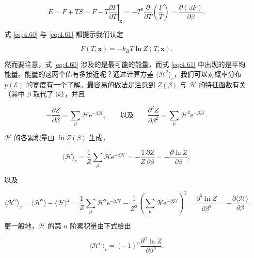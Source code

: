 \begin{equation}\label{eq:4.62}
  E=F+TS=F-T\left.\frac{\partial F}{\partial T}\right|_{\mathbf x}=-T^2\frac{\partial}{\partial T}\left(\frac{F}{T}\right)=\frac{\partial(\beta F)}{\partial\beta}.
\end{equation}

式 \eqref{eq:4.60} 与 \eqref{eq:4.61} 都提示我们认定

\begin{equation}\label{eq:4.63}
  F(T,\mathbf x)=-k_BT\ln Z(T,\mathbf x).
\end{equation}

然而要注意，式 \eqref{eq:4.60} 涉及的是最可能的能量，而式 \eqref{eq:4.61} 中出现的是平均能量。能量的这两个值有多接近呢？通过计算方差 $\langle\mathscr H^2\rangle_c$，我们可以对概率分布 $p(\mathcal{E})$ 的宽度有一个了解。最容易的做法是注意到 $Z(\beta)$ 与 $\mathscr H$ 的特征函数有关（其中 $\beta$ 取代了 $\mathrm{i}k$），并且

\begin{equation}\label{eq:4.64}
  -\frac{\partial Z}{\partial\beta}=\sum_\mu\mathscr H\mathrm{e}^{-\beta\mathscr H},\qquad\text{以及}\qquad \frac{\partial^2Z}{\partial\beta^2}=\sum_\mu\mathscr H^2\mathrm{e}^{-\beta\mathscr H}.
\end{equation}

$\mathscr H$ 的各累积量由 $\ln Z(\beta)$ 生成，

\begin{equation}\label{eq:4.65}
  \langle\mathscr H\rangle_c=\frac{1}{Z}\sum_\mu\mathscr H\mathrm{e}^{-\beta\mathscr H}=-\frac{1}{Z}\frac{\partial Z}{\partial\beta}=-\frac{\partial\ln Z}{\partial\beta},
\end{equation}

以及

\begin{equation}\label{eq:4.66}
  \langle\mathscr H^2\rangle_c=\langle\mathscr H^2\rangle-\langle\mathscr H\rangle^2=\frac{1}{Z}\sum_\mu\mathscr H^2\mathrm{e}^{-\beta\mathscr H}-\frac{1}{Z^2}\left(\sum_\mu\mathscr H\mathrm{e}^{-\beta\mathscr H}\right)^2=\frac{\partial^2\ln Z}{\partial\beta^2}=-\frac{\partial\langle\mathscr H\rangle}{\partial\beta}.
\end{equation}

更一般地，$\mathscr H$ 的第 $n$ 阶累积量由下式给出

\begin{equation}\label{eq:4.67}
  \langle\mathscr H^n\rangle_c=(-1)^n\frac{\partial^n\ln Z}{\partial\beta^n}.
\end{equation}


